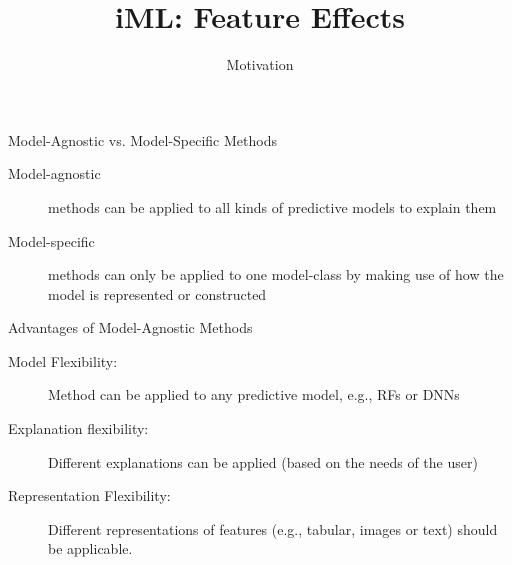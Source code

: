 \documentclass[aspectratio=169]{../latex_main/tntbeamer}  %
\title[Introduction]{iML: Feature Effects}
\subtitle{Motivation}
\begin{document}
	
	\maketitle


\begin{frame}[c]{Model-Agnostic vs. Model-Specific Methods}

    \begin{description}
        \item[Model-agnostic] methods can be applied to all kinds of predictive models to explain them
        \medskip
        \item[Model-specific] methods can only be applied to one model-class by making use of how the model is represented or constructed
    \end{description}

\end{frame}

\begin{frame}[c]{Advantages of Model-Agnostic Methods }

    \begin{description}
        \item[Model Flexibility:] Method can be applied to any predictive model, e.g., RFs or DNNs
        \item[Explanation flexibility:] Different explanations can be applied (based on the needs of the user)
        \item[Representation Flexibility:] Different representations of features (e.g., tabular, images or text) should be applicable.
    \end{description}

\end{frame}
\end{document}
